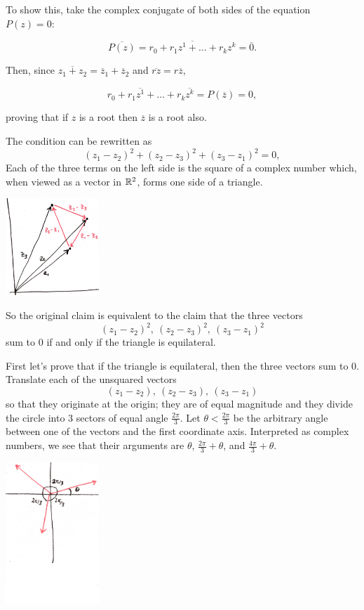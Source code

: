 \documentclass[12pt]{article}
\renewcommand{\bar}{\overline}
\begin{document}
\begin{description}
  To show this, take the complex conjugate of both sides of the equation
  $P(z) = 0$:

  $$
  \bar{P(z)} = \bar{r_0 + r_1z^1 + \ldots + r_kz^k} = \bar 0.
  $$

  Then, since $\bar{z_1 + z_2} = \bar z_1 + \bar z_2$ and $\bar{rz} = r\bar{z}$,

  $$
  r_0 + r_1\bar{z^1} + \ldots + r_k\bar{z^k} = P(\bar z) = 0,
  $$

  proving that if $z$ is a root then $\bar z$ is a root also.


  The condition can be rewritten as
  $$
  (z_1 - z_2)^2 + (z_2 - z_3)^2 + (z_3 - z_1)^2 = 0,
  $$
  Each of the three terms on the left side is the square of a complex number
  which, when viewed as a vector in $\mathbb{R}^2$, forms one side of a triangle.

  \includegraphics[width=100pt]{img/equilateral-1.png}

  So the original claim is equivalent to the claim that the three vectors
  $$
  (z_1 - z_2)^2, ~ (z_2 - z_3)^2, ~ (z_3 - z_1)^2
  $$
  sum to 0 if and only if the triangle is equilateral.

  First let's prove that if the triangle is equilateral, then the three vectors
  sum to 0. Translate each of the unsquared vectors
  $$
  (z_1 - z_2), ~ (z_2 - z_3), ~ (z_3 - z_1)
  $$
  so that they originate at the origin; they are of equal magnitude and they
  divide the circle into 3 sectors of equal angle $\frac{2\pi}{3}$. Let
  $\theta < \frac{2\pi}{3}$ be the arbitrary angle between one of the vectors and
  the first coordinate axis. Interpreted as complex numbers, we see that their
  arguments are $\theta$, $\frac{2\pi}{3} + \theta$, and
  $\frac{4\pi}{3} + \theta$.

  \includegraphics[width=100pt]{img/equilateral-2.png}


\end{description}
\end{document}

